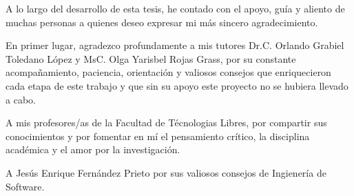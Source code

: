 \agradecimient

\parskip 10pt  \setlength{\parindent}{0pc}

A lo largo del desarrollo de esta tesis, he contado con el apoyo, guía y aliento de muchas personas a quienes deseo expresar mi más sincero agradecimiento.

En primer lugar, agradezco profundamente a mis tutores Dr.C. Orlando Grabiel Toledano López y MsC. Olga Yarisbel Rojas Grass, por su constante acompañamiento, paciencia, orientación y valiosos consejos que enriquecieron cada etapa de este trabajo y que sin su apoyo este proyecto no se hubiera llevado a cabo.

A mis profesores/as de la Facultad de Técnologias Libres, por compartir sus conocimientos y por fomentar en mí el pensamiento crítico, la disciplina académica y el amor por la investigación.

A Jesús Enrique Fernández Prieto por sus valiosos consejos de Ingienería de Software.
